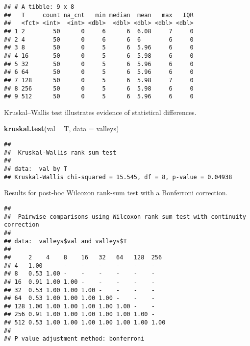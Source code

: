 \documentclass[]{book}
\newenvironment{Shaded}{\begin{snugshade}}{\end{snugshade}}
\newcommand{\DataTypeTok}[1]{\textcolor[rgb]{0.13,0.29,0.53}{#1}}
\newcommand{\KeywordTok}[1]{\textcolor[rgb]{0.13,0.29,0.53}{\textbf{#1}}}
\newcommand{\NormalTok}[1]{#1}
\newcommand{\OperatorTok}[1]{\textcolor[rgb]{0.81,0.36,0.00}{\textbf{#1}}}
\newcommand{\OtherTok}[1]{\textcolor[rgb]{0.56,0.35,0.01}{#1}}
\newcommand{\StringTok}[1]{\textcolor[rgb]{0.31,0.60,0.02}{#1}}
\begin{document}
\begin{verbatim}
## # A tibble: 9 x 8
##   T     count na_cnt   min median  mean   max   IQR
##   <fct> <int>  <int> <dbl>  <dbl> <dbl> <dbl> <dbl>
## 1 2        50      0     6      6  6.08     7     0
## 2 4        50      0     6      6  6        6     0
## 3 8        50      0     5      6  5.96     6     0
## 4 16       50      0     5      6  5.98     6     0
## 5 32       50      0     5      6  5.96     6     0
## 6 64       50      0     5      6  5.96     6     0
## 7 128      50      0     5      6  5.98     7     0
## 8 256      50      0     5      6  5.98     6     0
## 9 512      50      0     5      6  5.96     6     0
\end{verbatim}

Kruskal--Wallis test illustrates evidence of statistical differences.

\begin{Shaded}
\begin{Highlighting}[]
\KeywordTok{kruskal.test}\NormalTok{(val }\OperatorTok{~}\StringTok{ }\NormalTok{T, }\DataTypeTok{data =}\NormalTok{ valleys)}
\end{Highlighting}
\end{Shaded}

\begin{verbatim}
## 
##  Kruskal-Wallis rank sum test
## 
## data:  val by T
## Kruskal-Wallis chi-squared = 15.545, df = 8, p-value = 0.04938
\end{verbatim}

Results for post-hoc Wilcoxon rank-sum test with a Bonferroni correction.

\begin{Shaded}
\end{Shaded}

\begin{verbatim}
## 
##  Pairwise comparisons using Wilcoxon rank sum test with continuity correction 
## 
## data:  valleys$val and valleys$T 
## 
##     2    4    8    16   32   64   128  256 
## 4   1.00 -    -    -    -    -    -    -   
## 8   0.53 1.00 -    -    -    -    -    -   
## 16  0.91 1.00 1.00 -    -    -    -    -   
## 32  0.53 1.00 1.00 1.00 -    -    -    -   
## 64  0.53 1.00 1.00 1.00 1.00 -    -    -   
## 128 1.00 1.00 1.00 1.00 1.00 1.00 -    -   
## 256 0.91 1.00 1.00 1.00 1.00 1.00 1.00 -   
## 512 0.53 1.00 1.00 1.00 1.00 1.00 1.00 1.00
## 
## P value adjustment method: bonferroni
\end{verbatim}
\end{document}

